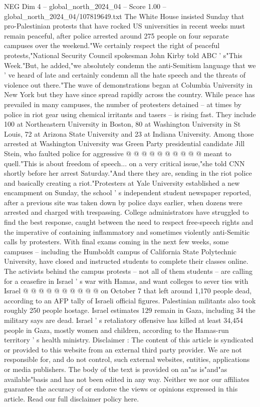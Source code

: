 \begin{textsample}{NEG Dim 4 – global\_north\_2024\_04 – Score 1.00 – global\_north\_2024\_04/107819649.txt}  \label{ex:f4_neg_098}
The White House insisted Sunday that pro-Palestinian protests that have rocked US universities in recent weeks must remain peaceful, after police arrested around 275 people on four separate campuses over the weekend."We certainly respect the right of peaceful protests,"National Security Council spokesman John Kirby told ABC ' s"This Week."But, he added,"we absolutely condemn the anti-Semitism language that we ' ve heard of late and certainly condemn all the hate speech and the threats of violence out there."The wave of demonstrations began at Columbia University in New York but they have since spread rapidly across the country.
While peace has prevailed in many campuses, the number of protesters detained -- at times by police in riot gear using chemical irritants and tasers -- is rising fast.
They include 100 at Northeastern University in Boston, 80 at Washington University in St Louis, 72 at Arizona State University and 23 at Indiana University.
Among those arrested at Washington University was Green Party presidential candidate Jill Stein, who faulted police for aggressive @ @ @ @ @ @ @ @ @ @ meant to quell."This is about freedom of speech... on a very critical issue,"she told CNN shortly before her arrest Saturday."And there they are, sending in the riot police and basically creating a riot."Protesters at Yale University established a new encampment on Sunday, the school ' s independent student newspaper reported, after a previous site was taken down by police days earlier, when dozens were arrested and charged with trespassing.
College administrators have struggled to find the best response, caught between the need to respect free-speech rights and the imperative of containing inflammatory and sometimes violently anti-Semitic calls by protesters.
With final exams coming in the next few weeks, some campuses -- including the Humboldt campus of California State Polytechnic University, have closed and instructed students to complete their classes online.
The activists behind the campus protests -- not all of them students -- are calling for a ceasefire in Israel ' s war with Hamas, and want colleges to sever ties with Israel @ @ @ @ @ @ @ @ @ @ on October 7 that left around 1,170 people dead, according to an AFP tally of Israeli official figures.
Palestinian militants also took roughly 250 people hostage.
Israel estimates 129 remain in Gaza, including 34 the military says are dead.
Israel ' s retaliatory offensive has killed at least 34,454 people in Gaza, mostly women and children, according to the Hamas-run territory ' s health ministry.
Disclaimer : The content of this article is syndicated or provided to this website from an external third party provider.
We are not responsible for, and do not control, such external websites, entities, applications or media publishers.
The body of the text is provided on an"as is"and"as available"basis and has not been edited in any way.
Neither we nor our affiliates guarantee the accuracy of or endorse the views or opinions expressed in this article.
Read our full disclaimer policy here.

\end{textsample}
